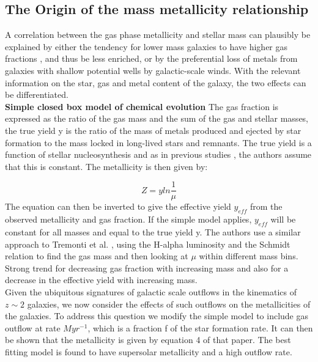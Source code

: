 \documentclass{literature}
\begin{document}
\subsection{The Origin of the mass metallicity relationship}
A correlation between the gas phase metallicity and stellar mass can plausibly be explained by either the tendency for lower mass galaxies to have higher gas fractions \citep{McGaugh1997}, \citep{Bell2000} and thus be less enriched, or by the preferential loss of metals from galaxies with shallow potential wells by galactic-scale winds. With the relevant information on the star, gas and metal content of the galaxy, the two effects can be differentiated. \\ 
\textbf{Simple closed box model of chemical evolution}
The gas fraction is expressed as the ratio of the gas mass and the sum of the gas and stellar masses, the true yield y is the ratio of the mass of metals produced and ejected by star formation to the mass locked in long-lived stars and remnants. The true yield is a function of stellar nucleosynthesis and as in previous studies \citep{Tremonti2004}, \citep{Garnett2002} the authors assume that this is constant. The metallicity is then given by: 

\begin{equation}
	Z = yln\frac{1}{\mu}
\end{equation}
The equation can then be inverted to give the effective yield $y_{eff}$ from the observed metallicity and gas fraction. If the simple model applies, $y_{eff}$ will be constant for all masses and equal to the true yield y. The authors use a similar approach to Tremonti et al. \citep{Tremonti2004}, using the H-alpha luminosity and the Schmidt relation to find the gas mass and then looking at $\mu$ within different mass bins. Strong trend for decreasing gas fraction with increasing mass and also for a decrease in the effective yield with increasing mass. \\ 
Given the ubiquitous signatures of galactic scale outflows in the kinematics of $z \sim 2$ galaxies, we now consider the effects of such outflows on the metallicities of the galaxies. To address this question we modify the simple model to include gas outflow at rate $Myr^{-1}$, which is a fraction f of the star formation rate. It can then be shown that the metallicity is given by equation 4 of that paper. The best fitting model is found to have supersolar metallicity and a high outflow rate. 
\end{document}
